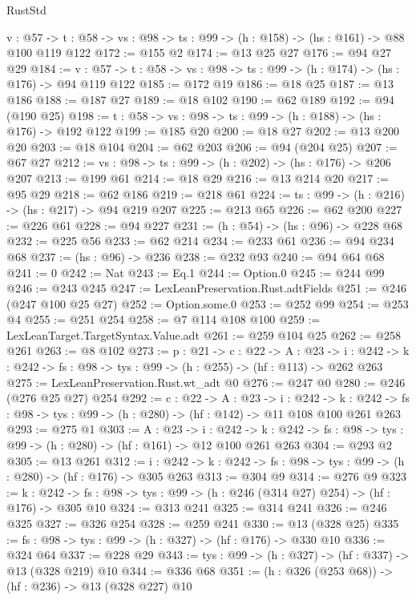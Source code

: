 \begin{lexlean}{RustStd}
\begin{coremodule}
  {v : @57} ->
  {t : @58} -> {vs : @98} -> {ts : @99} -> (h : @158) -> (hs : @161) -> @88 @100 @119 @122
@172 := @155 @2
@174 := @13 @25 @27
@176 := @94 @27 @29
@184 := {v : @57} ->
  {t : @58} -> {vs : @98} -> {ts : @99} -> (h : @174) -> (hs : @176) -> @94 @119 @122
@185 := @172 @19
@186 := @18 @25
@187 := @13 @186
@188 := @187 @27
@189 := @18 @102
@190 := @62 @189
@192 := @94 (@190 @25)
@198 := {t : @58} -> {vs : @98} -> {ts : @99} -> (h : @188) -> (hs : @176) -> @192 @122
@199 := @185 @20
@200 := @18 @27
@202 := @13 @200 @20
@203 := @18 @104
@204 := @62 @203
@206 := @94 (@204 @25)
@207 := @67 @27
@212 := {vs : @98} -> {ts : @99} -> (h : @202) -> (hs : @176) -> @206 @207
@213 := @199 @61
@214 := @18 @29
@216 := @13 @214 @20
@217 := @95 @29
@218 := @62 @186
@219 := @218 @61
@224 := {ts : @99} -> (h : @216) -> (hs : @217) -> @94 @219 @207
@225 := @213 @65
@226 := @62 @200
@227 := @226 @61
@228 := @94 @227
@231 := (h : @54) -> (hs : @96) -> @228 @68
@232 := @225 @56
@233 := @62 @214
@234 := @233 @61
@236 := @94 @234 @68
@237 := (hs : @96) -> @236
@238 := @232 @93
@240 := @94 @64 @68
@241 := 0
@242 := Nat
@243 := Eq.{1}
@244 := Option.{0}
@245 := @244 @99
@246 := @243 @245
@247 := LexLeanPreservation.Rust.adtFields
@251 := @246 (@247 @100 @25 @27)
@252 := Option.some.{0}
@253 := @252 @99
@254 := @253 @4
@255 := @251 @254
@258 := @7 @114 @108 @100
@259 := LexLeanTarget.TargetSyntax.Value.adt
@261 := @259 @104 @25
@262 := @258 @261
@263 := @8 @102
@273 := {p : @21} ->
  {c : @22} ->
  {A : @23} ->
  {i : @242} -> {k : @242} -> {fs : @98} -> {tys : @99} -> (h : @255) -> (hf : @113) -> @262 @263
@275 := LexLeanPreservation.Rust.wt_adt @0
@276 := @247 @0
@280 := @246 (@276 @25 @27) @254
@292 := {c : @22} ->
  {A : @23} ->
  {i : @242} ->
  {k : @242} -> {fs : @98} -> {tys : @99} -> (h : @280) -> (hf : @142) -> @11 @108 @100 @261 @263
@293 := @275 @1
@303 := {A : @23} ->
  {i : @242} ->
  {k : @242} -> {fs : @98} -> {tys : @99} -> (h : @280) -> (hf : @161) -> @12 @100 @261 @263
@304 := @293 @2
@305 := @13 @261
@312 := {i : @242} ->
  {k : @242} -> {fs : @98} -> {tys : @99} -> (h : @280) -> (hf : @176) -> @305 @263
@313 := @304 @9
@314 := @276 @9
@323 := {k : @242} ->
  {fs : @98} -> {tys : @99} -> (h : @246 (@314 @27) @254) -> (hf : @176) -> @305 @10
@324 := @313 @241
@325 := @314 @241
@326 := @246 @325
@327 := @326 @254
@328 := @259 @241
@330 := @13 (@328 @25)
@335 := {fs : @98} -> {tys : @99} -> (h : @327) -> (hf : @176) -> @330 @10
@336 := @324 @64
@337 := @228 @29
@343 := {tys : @99} -> (h : @327) -> (hf : @337) -> @13 (@328 @219) @10
@344 := @336 @68
@351 := (h : @326 (@253 @68)) -> (hf : @236) -> @13 (@328 @227) @10

\end{coremodule}
\end{lexlean}
